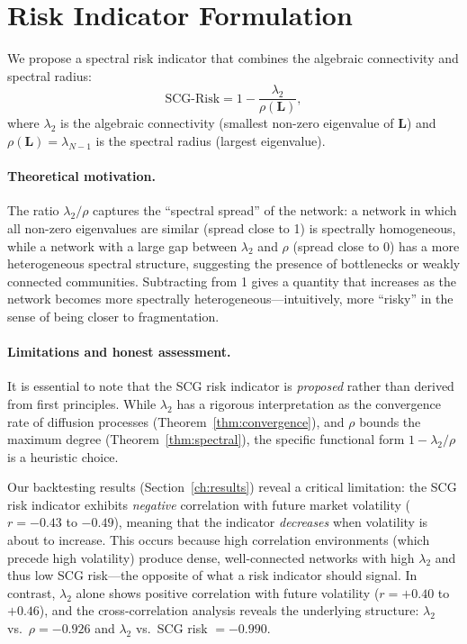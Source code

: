 \section{Risk Indicator Formulation}
\label{sec:risk_formulation}

We propose a spectral risk indicator that combines the algebraic
connectivity and spectral radius:
\begin{equation}
\text{SCG-Risk} = 1 - \frac{\lambda_2}{\rho(\mathbf{L})},
\label{eq:scg_risk}
\end{equation}
where $\lambda_2$ is the algebraic connectivity (smallest non-zero
eigenvalue of $\mathbf{L}$) and $\rho(\mathbf{L}) =
\lambda_{N-1}$ is the spectral radius (largest eigenvalue).

\paragraph{Theoretical motivation.}
The ratio $\lambda_2/\rho$ captures the ``spectral spread'' of the
network: a network in which all non-zero eigenvalues are similar
(spread close to 1) is spectrally homogeneous, while a network with a
large gap between $\lambda_2$ and $\rho$ (spread close to 0) has a
more heterogeneous spectral structure, suggesting the presence of
bottlenecks or weakly connected communities.  Subtracting from 1 gives
a quantity that increases as the network becomes more spectrally
heterogeneous---intuitively, more ``risky'' in the sense of being
closer to fragmentation.

\paragraph{Limitations and honest assessment.}
It is essential to note that the SCG risk indicator is \emph{proposed}
rather than derived from first principles.  While $\lambda_2$ has a
rigorous interpretation as the convergence rate of diffusion processes
(Theorem~\ref{thm:convergence}), and $\rho$ bounds the maximum degree
(Theorem~\ref{thm:spectral}), the specific functional form
$1 - \lambda_2/\rho$ is a heuristic choice.

Our backtesting results (Section~\ref{ch:results}) reveal a critical
limitation: the SCG risk indicator exhibits \emph{negative} correlation
with future market volatility ($r = -0.43$ to $-0.49$), meaning that
the indicator \emph{decreases} when volatility is about to increase.
This occurs because high correlation environments (which precede high
volatility) produce dense, well-connected networks with high
$\lambda_2$ and thus low SCG risk---the opposite of what a risk
indicator should signal.  In contrast, $\lambda_2$ alone shows positive
correlation with future volatility ($r = +0.40$ to $+0.46$), and
the cross-correlation analysis reveals the underlying structure:
$\lambda_2$ vs.\ $\rho = -0.926$ and $\lambda_2$ vs.\ SCG risk $=
-0.990$.

